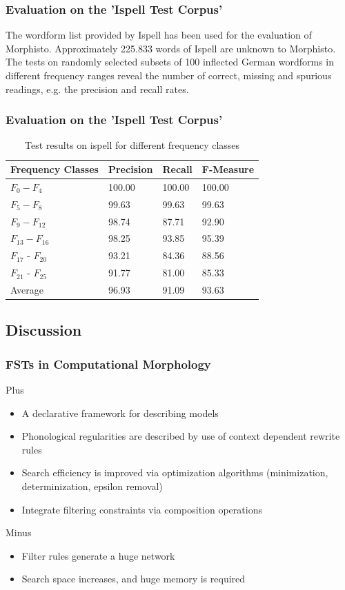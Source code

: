 \documentclass {beamer}
\begin{document}
\frame
{
\frametitle{Evaluation on the 'Ispell Test Corpus'}
The wordform list provided by Ispell has been used for the evaluation of Morphisto. 
Approximately 225.833 words 
of Ispell are unknown to Morphisto. 
The tests on randomly selected subsets of 100 inflected German wordforms in different frequency ranges reveal the number of correct, missing and spurious readings, e.g. the precision and recall rates.  
}

\frame
{
\frametitle{Evaluation on the 'Ispell Test Corpus'} 

\smallskip
\begin{table}[h] 
\begin{center}
	\begin{tabular}{ | p{} |  p{} | p{} | p{} |}
	\hline
\textbf{Frequency Classes} &  \textbf{Precision} & \textbf{Recall} & \textbf{F-Measure} \\
\hline
$F_{0} - F_{4}$ &  100.00 & 100.00 & 100.00 \\
\hline
$F_{5} - F_{8}$ &  99.63 & 99.63 & 99.63 \\
\hline
$F_{9} - F_{12}$ &  98.74 & 87.71 & 92.90 \\
\hline
$F_{13} - F_{16}$ & 98.25 & 93.85  & 95.39 \\
\hline
$F_{17}$ - $F_{20}$&  93.21 & 84.36 & 88.56 \\
\hline
$F_{21}$ - $F_{25}$  & 91.77 & 81.00 & 85.33 \\
\hline
\hline
Average &   96.93 & 91.09 & 93.63\\
\hline
\end{tabular}	
\caption{Test results on ispell for different frequency classes}
\end{center}
\end{table} 
\smallskip
}

\subsection{Discussion}
\frame
{\frametitle{FSTs in Computational Morphology}
Plus
\begin{itemize} 
\item A declarative framework for describing models
\item Phonological regularities are described by use of context dependent rewrite rules 
\item Search efficiency is improved via optimization algorithms (minimization, determinization, epsilon removal)
\item Integrate filtering constraints via composition operations
\end{itemize} 
Minus
\begin{itemize} 
\item Filter rules generate a huge network
\item Search space increases, and huge memory is required
\end{itemize}
}
\end{document}
